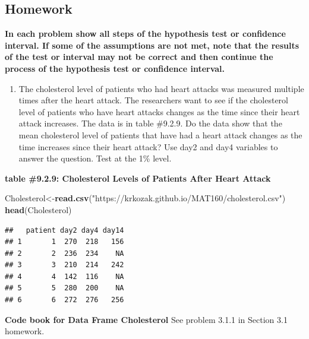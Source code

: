 \documentclass[
]{book}
\newenvironment{Shaded}{\begin{snugshade}}{\end{snugshade}}
\newcommand{\KeywordTok}[1]{\textcolor[rgb]{0.13,0.29,0.53}{\textbf{#1}}}
\newcommand{\NormalTok}[1]{#1}
\newcommand{\StringTok}[1]{\textcolor[rgb]{0.31,0.60,0.02}{#1}}
\providecommand{\tightlist}{%
  \setlength{\itemsep}{0pt}\setlength{\parskip}{0pt}}
\begin{document}
\hypertarget{homework-23}{%
\subsection{Homework}\label{homework-23}}

\textbf{In each problem show all steps of the hypothesis test or confidence interval. If some of the assumptions are not met, note that the results of the test or interval may not be correct and then continue the process of the hypothesis test or confidence interval.}

\begin{enumerate}
\def\labelenumi{\arabic{enumi}.}
\tightlist
\item
  The cholesterol level of patients who had heart attacks was measured multiple times after the heart attack. The researchers want to see if the cholesterol level of patients who have heart attacks changes as the time since their heart attack increases. The data is in table \#9.2.9. Do the data show that the mean cholesterol level of patients that have had a heart attack changes as the time increases since their heart attack? Use day2 and day4 variables to answer the question. Test at the 1\% level.
\end{enumerate}

\textbf{table \#9.2.9: Cholesterol Levels of Patients After Heart Attack}

\begin{Shaded}
\begin{Highlighting}[]
\NormalTok{Cholesterol<-}\KeywordTok{read.csv}\NormalTok{(}\StringTok{"https://krkozak.github.io/MAT160/cholesterol.csv"}\NormalTok{)}
\KeywordTok{head}\NormalTok{(Cholesterol)}
\end{Highlighting}
\end{Shaded}

\begin{verbatim}
##   patient day2 day4 day14
## 1       1  270  218   156
## 2       2  236  234    NA
## 3       3  210  214   242
## 4       4  142  116    NA
## 5       5  280  200    NA
## 6       6  272  276   256
\end{verbatim}

\textbf{Code book for Data Frame Cholesterol} See problem 3.1.1 in Section 3.1 homework.
\end{document}
